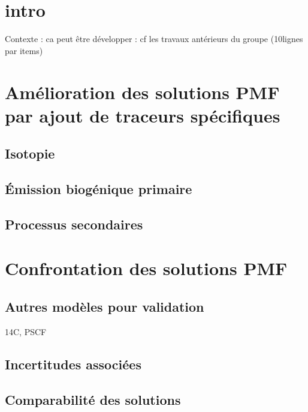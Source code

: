 
\section{intro}%
\label{sec:intro}

Contexte : ca peut être développer : cf les travaux antérieurs du groupe (10lignes par items)

\section{Amélioration des solutions PMF par ajout de traceurs spécifiques}%
\label{sec:amélioration_des_solutions_pmf}

\subsection{Isotopie}%
\label{sub:isotopie}

\subsection{Émission biogénique primaire}%
\label{sub:émission_biogénique_primaire}

\subsection{Processus secondaires}%
\label{sub:processus_secondaires}

\section{Confrontation des solutions PMF}%
\label{sec:confrontation_des_solutions_pmf}

\subsection{Autres modèles pour validation}%
\label{sub:autres_modèles_pour_validation}

14C, PSCF

\subsection{Incertitudes associées}%
\label{sub:incertitudes_associées}

\subsection{Comparabilité des solutions}%
\label{sub:comparabilité_des_solutions}

